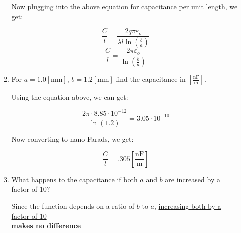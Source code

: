 \begin{enumerate}
\begin{enumerate}
        Now plugging into the above equation for capacitance per unit length, we get:

        $$\frac{C}{l}=\frac{2q\pi\varepsilon_o}{\lambda l\ln\left( \frac{b}{a} \right)}$$
        $$\boxed{\frac{C}{l}=\frac{2\pi\varepsilon_o}{\ln\left( \frac{b}{a} \right)}}$$

      \item For $a=1.0[\si{\milli\meter}]$, $b=1.2[\si{\milli\meter}]$ find the capacitance in $\left[ \frac{\si{\nano\farad}}{\si{\meter}} \right]$.

        Using the equation above, we can get:

        $$\frac{2\pi\cdot8.85\cdot10^{-12}}{\ln(1.2)}=3.05\cdot10^{-10}$$

        Now converting to nano-Farads, we get:

        $$\boxed{\frac{C}{l}=.305\left[ \frac{\si{\nano\farad}}{\si{\meter}} \right]}$$

      \item What happens to the capacitance if both $a$ and $b$ are increased by a factor of 10?

      Since the function depends on a ratio of $b$ to $a$, \underline{increasing both by a factor of 10}\\\underline{\textbf{makes no difference}}

    \end{enumerate}

\end{enumerate}



